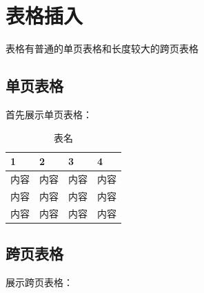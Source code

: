 \documentclass[a4paper,AutoFakeBold={2.7},UTF8,zihao=5,twoside]{ctexart} %
\numberwithin{equation}{section}%
\begin{document}
\clearpage

\section{表格插入}
表格有普通的单页表格和长度较大的跨页表格
\subsection{单页表格}
首先展示单页表格：

\begin{table}[htbp]%
	\caption{表名}\label{表名}
	\centering
	\begin{tabular}{p{3cm}<{\centering} p{3cm}<{\centering} p{3cm}<{\centering} p{3cm}<{\centering}}
		\toprule[1.5pt]
		1&2&3&4\\
		\midrule[0.75pt]
		内容&内容&内容&内容\\
		内容&内容&内容&内容\\
		内容&内容&内容&内容\\
		\bottomrule[1pt]
	\end{tabular}
\end{table}

\subsection{跨页表格}
展示跨页表格：
\end{document}
